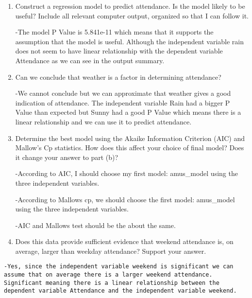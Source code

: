 \documentclass[]{article}
\newenvironment{Shaded}{\begin{snugshade}}{\end{snugshade}}
\newcommand{\KeywordTok}[1]{\textcolor[rgb]{0.13,0.29,0.53}{\textbf{#1}}}
\newcommand{\NormalTok}[1]{#1}
\newcommand{\OperatorTok}[1]{\textcolor[rgb]{0.81,0.36,0.00}{\textbf{#1}}}
\newcommand{\StringTok}[1]{\textcolor[rgb]{0.31,0.60,0.02}{#1}}
\begin{document}
\begin{enumerate}
\def\labelenumi{\alph{enumi}.}
\item
  Construct a regression model to predict attendance. Is the model
  likely to be useful? Include all relevant computer output, organized
  so that I can follow it.

  -The model P Value is 5.841e-11 which means that it supports the
  assumption that the model is useful. Although the independent variable
  rain does not seem to have linear relationship with the dependent
  variable Attendance as we can see in the output summary.
\item
  Can we conclude that weather is a factor in determining attendance?

  -We cannot conclude but we can approximate that weather gives a good
  indication of attendance. The independent variable Rain had a bigger P
  Value than expected but Sunny had a good P Value which means there is
  a linear relationship and we can use it to predict attendance.
\item
  Determine the best model using the Akaike Information Criterion (AIC)
  and Mallow's Cp statistics. How does this affect your choice of final
  model? Does it change your answer to part (b)?

  -According to AIC, I should choose my first model: amus\_model using
  the three independent variables.

  -According to Mallows cp, we should choose the first model:
  amus\_model using the three independent variables.

  -AIC and Mallows test should be the about the same.
\item
  Does this data provide sufficient evidence that weekend attendance is,
  on average, larger than weekday attendance? Support your answer.
\end{enumerate}

\begin{verbatim}
-Yes, since the independent variable weekend is significant we can assume that on average there is a larger weekend attendance. Significant meaning there is a linear relationship between the dependent variable Attendance and the independent variable weekend. 
\end{verbatim}

\begin{Shaded}
\end{Shaded}
\end{document}
